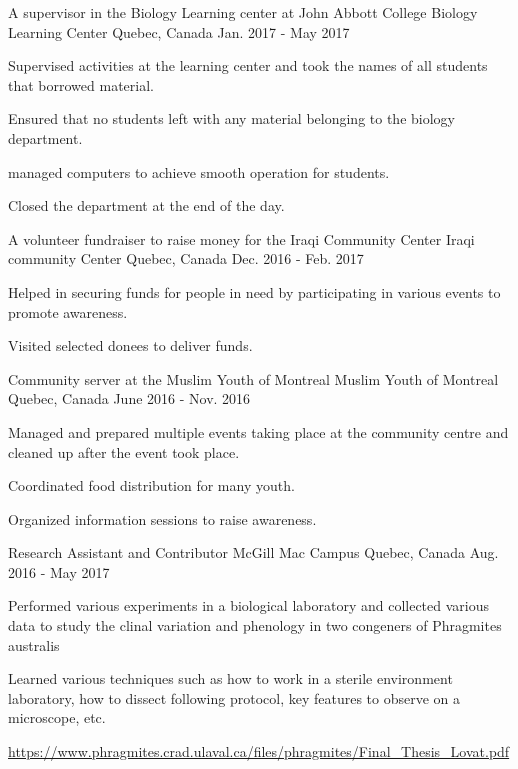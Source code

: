 \begin{cventries}
  \cventry
    {A supervisor in the Biology Learning center at John Abbott College}
    {Biology Learning Center}
    {Quebec, Canada}
    {Jan. 2017 - May 2017}
    {
      \begin{cvitems}
        \item {Supervised activities at the learning center and took the names of all students that borrowed material.}
        \item {Ensured that no students left with any material belonging to the biology department.}
        \item {managed computers to achieve smooth operation for students.}
        \item {Closed the department at the end of the day.}
      \end{cvitems}
    }    \newline
    \cventry
    {A volunteer fundraiser to raise money for the Iraqi Community Center}
    {Iraqi community Center}
    {Quebec, Canada}
    {Dec. 2016 - Feb. 2017}
    {
      \begin{cvitems}
        \item {Helped in securing funds for people in need by participating in various events to promote awareness.}
        \item {Visited selected donees to deliver funds.}
      \end{cvitems}
    } \newline
    \cventry
    {Community server at the Muslim Youth of Montreal}
    {Muslim Youth of Montreal}
    {Quebec, Canada}
    {June 2016 - Nov. 2016}
    {
      \begin{cvitems}
        \item {Managed and prepared multiple events taking place at the community centre and cleaned up after the event took place.}
        \item {Coordinated food distribution for many youth.}
        \item {Organized information sessions to raise awareness.}
      \end{cvitems}
    } \newline
     \cventry
    {Research Assistant
and Contributor}
    {McGill Mac Campus}
    {Quebec, Canada}
    {Aug. 2016 - May 2017}
    {
      \begin{cvitems}
        \item {Performed various experiments in a biological laboratory and collected various data to study the clinal variation and phenology in two congeners of Phragmites australis}
        \item {Learned various techniques such as how to work in a sterile environment laboratory, how to dissect following protocol, key features to observe on a microscope, etc. }
        \item{\url{https://www.phragmites.crad.ulaval.ca/files/phragmites/Final_Thesis_Lovat.pdf}}
      \end{cvitems}
    }\newline
    \end{cventries}
